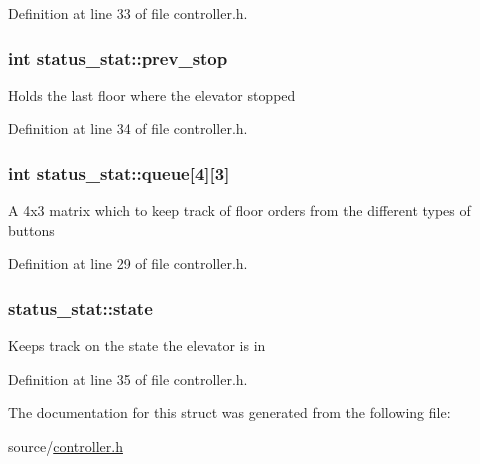 Definition at line 33 of file controller.\+h.

\subsubsection[{\texorpdfstring{prev\+\_\+stop}{prev_stop}}]{\setlength{\rightskip}{0pt plus 5cm}int status\+\_\+stat\+::prev\+\_\+stop}\hypertarget{structstatus__stat_a7dd508943eea5b0fca1ab663c7d520fc}{}\label{structstatus__stat_a7dd508943eea5b0fca1ab663c7d520fc}
Holds the last floor where the elevator stopped 

Definition at line 34 of file controller.\+h.

\subsubsection[{\texorpdfstring{queue}{queue}}]{\setlength{\rightskip}{0pt plus 5cm}int status\+\_\+stat\+::queue\mbox{[}4\mbox{]}\mbox{[}3\mbox{]}}\hypertarget{structstatus__stat_ad8dbbabdd11cad499360434a98fc4800}{}\label{structstatus__stat_ad8dbbabdd11cad499360434a98fc4800}
A 4x3 matrix which to keep track of floor orders from the different types of buttons 

Definition at line 29 of file controller.\+h.

\subsubsection[{\texorpdfstring{state}{state}}]{ status\+\_\+stat\+::state}\hypertarget{structstatus__stat_ac485f83fea98239454b3ec1eb49e29cc}{}\label{structstatus__stat_ac485f83fea98239454b3ec1eb49e29cc}
Keeps track on the state the elevator is in 

Definition at line 35 of file controller.\+h.



The documentation for this struct was generated from the following file\+:\begin{DoxyCompactItemize}
\item 
source/\hyperlink{controller_8h}{controller.\+h}\end{DoxyCompactItemize}
